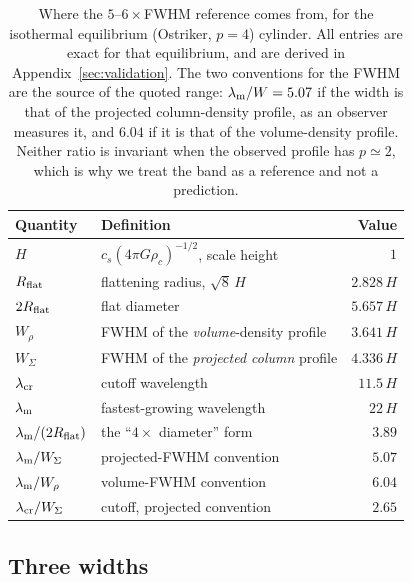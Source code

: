 \documentclass[usenatbib,twoside,twocolumn]{mnras}
\begin{document}
\begin{table}
\caption{Where the $5$--$6\times$FWHM reference comes from, for the isothermal equilibrium (Ostriker, $p=4$) cylinder. All entries are exact for that equilibrium, and are derived in Appendix~\ref{sec:validation}. The two conventions for the FWHM are the source of the quoted range: $\lambda_{\rm m}/W=5.07$ if the width is that of the projected column-density profile, as an observer measures it, and $6.04$ if it is that of the volume-density profile. Neither ratio is invariant when the observed profile has $p\simeq2$, which is why we treat the band as a reference and not a prediction.}
\label{tab:benchmark}
\footnotesize
\setlength{\tabcolsep}{4pt}
\setlength{\tabcolsep}{3pt}
\begin{tabular}{@{}lp{4.15cm}r@{}}
\toprule
Quantity & Definition & Value \\
\midrule
$H$ & $c_s(4\pi G\rho_c)^{-1/2}$, scale height & $1$ \\
$R_{\rm flat}$ & flattening radius, $\sqrt{8}\,H$ & $2.828\,H$ \\
$2R_{\rm flat}$ & flat diameter & $5.657\,H$ \\
$W_{\rho}$ & FWHM of the \emph{volume}-density profile & $3.641\,H$ \\
$W_{\Sigma}$ & FWHM of the \emph{projected column} profile & $4.336\,H$ \\
$\lambda_{\rm cr}$ & cutoff wavelength & $11.5\,H$ \\
$\lambda_{\rm m}$ & fastest-growing wavelength & $22\,H$ \\
\midrule
$\lambda_{\rm m}/(2R_{\rm flat})$ & the ``$4\times$ diameter'' form & $3.89$ \\
$\lambda_{\rm m}/W_{\Sigma}$ & projected-FWHM convention & $5.07$ \\
$\lambda_{\rm m}/W_{\rho}$ & volume-FWHM convention & $6.04$ \\
$\lambda_{\rm cr}/W_{\Sigma}$ & cutoff, projected convention & $2.65$ \\
\bottomrule
\end{tabular}
\end{table}


\subsection{Three widths}
\label{sec:width_correction}
\end{document}
